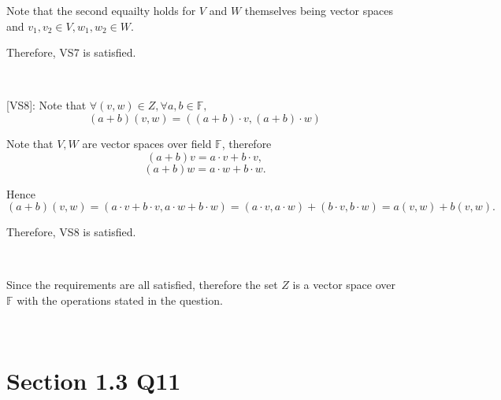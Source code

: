 \documentclass[12pt]{article}%
\begin{document}
Note that the second equailty holds for $V$ and $W$ themselves being vector spaces and $v_1,v_2 \in V, w_1, w_2\in W.$

Therefore, VS7 is satisfied. 

~\ 

[VS8]: Note that $\forall (v,w)\in Z, \forall a,b \in \mathbb{F},$ $$(a+b)(v,w)=((a+b)\cdot v,(a+b)\cdot w )$$ 

Note that $V,W$ are vector spaces over field $\mathbb{F}$, therefore $$(a+b)v=a\cdot v + b\cdot v,$$ $$(a+b)w=a\cdot w + b\cdot w.$$

Hence $$(a+b)(v,w)=(a\cdot v + b\cdot v,a\cdot w + b\cdot w)=(a\cdot v, a\cdot w)+ (b\cdot v, b\cdot w)=a(v,w)+b(v,w).$$

Therefore, VS8 is satisfied. 

~\ 

Since the requirements are all satisfied, therefore the set $Z$ is a vector space over $\mathbb{F}$ with the operations stated in the question.

~\ 

\section{Section 1.3 Q11}
\end{document}
